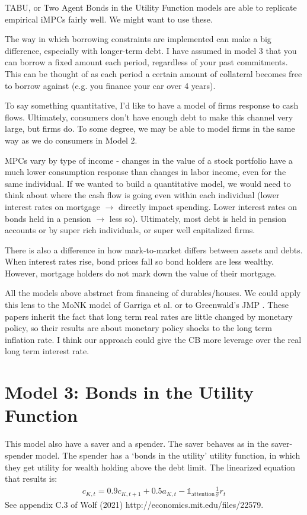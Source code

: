 \documentclass[AER]{AEA}
\begin{document}
TABU, or Two Agent Bonds in the Utility Function models are able to replicate empirical iMPCs fairly well. We might want to use these.

The way in which borrowing constraints are implemented can make a big difference, especially with longer-term debt. I have assumed in model 3 that you can borrow a fixed amount each period, regardless of your past commitments. This can be thought of as each period a certain amount of collateral becomes free to borrow against (e.g. you finance your car over 4 years).

To say something quantitative, I'd like to have a model of firms response to cash flows. Ultimately, consumers don't have enough debt to make this channel very large, but firms do. To some degree, we may be able to model firms in the same way as we do consumers in Model 2.

MPCs vary by type of income - changes in the value of a stock portfolio have a much lower consumption response than changes in labor income, even for the same individual. If we wanted to build a quantitative model, we would need to think about where the cash flow is going even within each individual (lower interest rates on mortgage $\rightarrow$ directly impact spending. Lower interest rates on bonds held in a pension $\rightarrow$ less so). Ultimately, most debt is held in pension accounts or by super rich individuals, or super well capitalized firms. 

There is also a difference in how mark-to-market differs between assets and debts. When interest rates rise, bond prices fall so bond holders are less wealthy. However, mortgage holders do not mark down the value of their mortgage.

All the models above abstract from financing of durables/houses.  We could apply this lens to the MoNK model of Garriga et al. \cite{garriga_monk_2019} or to Greenwald's JMP \cite{greenwald_mortgage_2018}. These papers inherit the fact that long term real rates are little changed by monetary policy, so their results are about monetary policy shocks to the long term inflation rate. I think our approach could give the CB more leverage over the real long term interest rate.

\section{Model 3: Bonds in the Utility Function}

This model also have a saver and a spender. The saver behaves as in the saver-spender model. The spender has a `bonds in the utility' utility function, in which they get utility for wealth holding above the debt limit. The linearized equation that results is:
\begin{align}
	c_{K,t} = 0.9 c_{K,t+1} + 0.5 a_{K,t}   - \mathds{1}_{\text{attention}} \frac{1}{\sigma}r_t
\end{align}
See appendix C.3 of Wolf (2021) http://economics.mit.edu/files/22579.
\end{document}
